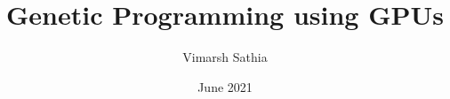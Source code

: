 \documentclass[BTech]{iitmdiss}
\begin{document}


\title{Genetic Programming using GPUs}
\author{Vimarsh Sathia}
\date{June 2021}

\begin{singlespace}
\maketitle 
\end{singlespace} 







\begin{singlespace}
\tableofcontents
\thispagestyle{empty}

\listoftables
{}
\listoffigures
{}
\end{singlespace}


% 








% 
% 

\end{document}

